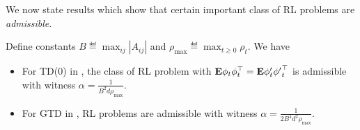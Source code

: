 \begin{comment}
\subsection{Proof Sketch}
The core part of the proof involves analyzing what we call the error dynamics
\begin{align}\label{eq:errmain}
\begin{split}
\theta_t&=\theta_{t-1}+\alpha\big(b_t-A_t\theta_{t-1}\big)\\
\theta_t-\ts&=\theta_{t-1}-\ts+\alpha\big(b_t-A_t(\theta_{t-1}-\ts+\ts)\big), (\text{letting} e_t\eqdef\theta_t-\ts) \\
e_t&=(I-\alpha A_t)e_{t-1}+\alpha(b_t -b -(A_t-A)\ts)\\
e_t&=(I-\alpha A_t)e_{t-1}+\alpha\zeta_t,
\end{split}
\end{align}
where $\zeta_t\eqdef(b_t -b -(A_t-A)\ts)$. A way to look at \eqref{eq:errmain} it that at each time $t$, the error $e_t$ is multiplied by the random matrix $(I-\alpha A_t)$ and is added by a zero mean noise. Intuitively speaking, the noise part is taken care of by the PR average, and what remains to be investigated is behaviour of the random matrix. In fact, the recursion \eqref{eq:errmain} can be unfurled as below
\begin{align*}
e_t
& = (I-\alpha A_t) (I-\alpha A_{t-1}) e_{t-2}\\ &+ \alpha (I-\alpha A_t) \zeta_{t-1} +\alpha \zeta_t \\
& \quad \vdots\\
& = (I-\alpha A_t) \cdots (I-\alpha A_1) e_0\\ &+ \alpha (I-\alpha A_t) \cdots (I-\alpha A_2) \zeta_1 \\
& + \alpha (I-\alpha A_t) \cdots (I-\alpha A_3) \zeta_2\\
&  \quad \vdots \\
&+ \alpha \zeta_t\,,
\end{align*}
by which it is clear that the product of the random matrices of the form $(I-\alpha A_s)\ldots(I-\alpha A_1)$ (for $s=1,\ldots,t$) play a crucial role. We need to ensure that these products do not `blow up' with time which is 
\end{comment}

We now state results which show that certain important class of RL problems are \emph{admissible}.
\begin{theorem}\label{th:tdadmis}
Define constants $B\eqdef\max_{ij}\left|A_{ij}\right|$ and $\rho_{\max}\eqdef\max_{t\geq 0}\rho_t$. We have
\begin{itemize}[leftmargin=*]
\item For TD(0) in , the class of RL problem with $\mathbf{E}{\phi_t\phi_t^\top}=\mathbf{E}{\phi'_t{\phi'}_t^\top}$ is admissible with witness $\alpha=\frac{1}{B^2 d\rho_{\max}}$.
\item For GTD in , RL problems are admissible with witness $\alpha=\frac{1}{2B^4d^2\rho_{\max}}$.
\end{itemize}

\end{theorem}

